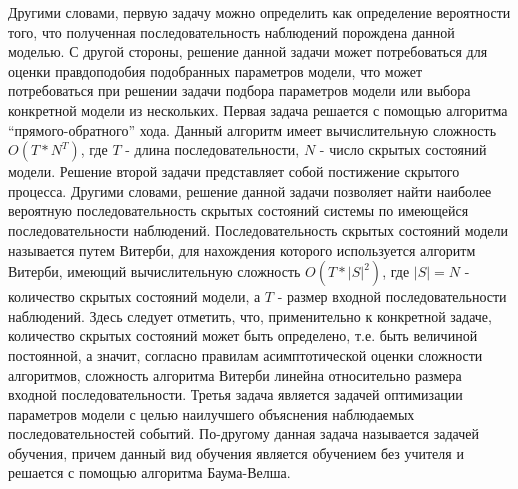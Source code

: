 Другими словами, первую задачу можно определить как определение вероятности того, что полученная последовательность наблюдений порождена данной моделью. С другой стороны, решение данной задачи может потребоваться для оценки правдоподобия подобранных параметров модели, что может потребоваться при решении задачи подбора параметров модели или выбора конкретной модели из нескольких. Первая задача решается с помощью алгоритма ``прямого-обратного'' хода. Данный алгоритм имеет вычислительную сложность \(O(T * N^T)\), где \(T\) - длина последовательности, \(N\) - число скрытых состояний модели. Решение второй задачи представляет собой постижение скрытого процесса. Другими словами, решение данной задачи позволяет найти наиболее вероятную последовательность скрытых состояний системы по имеющейся последовательности наблюдений. Последовательность скрытых состояний модели называется путем Витерби, для нахождения которого используется алгоритм Витерби, имеющий вычислительную сложность \(O(T * |S|^2)\), где \(|S| = N\) - количество скрытых состояний модели, а \(T\) - размер входной последовательности наблюдений. Здесь следует отметить, что, применительно к конкретной задаче, количество скрытых состояний может быть определено, т.е. быть величиной постоянной, а значит, согласно правилам асимптотической оценки \cite{clrs} сложности алгоритмов, сложность алгоритма Витерби линейна относительно размера входной последовательности. Третья задача является задачей оптимизации параметров модели с целью наилучшего объяснения наблюдаемых последовательностей событий. По-другому данная задача называется задачей обучения, причем данный вид обучения является обучением без учителя и решается с помощью алгоритма Баума-Велша.

